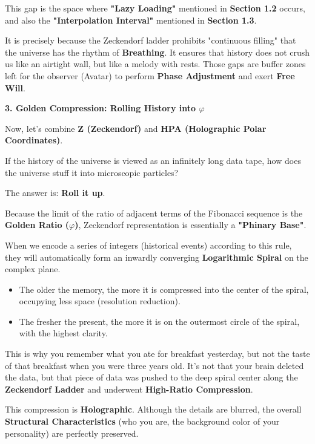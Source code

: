 This gap is the space where \textbf{"Lazy Loading"} mentioned in \textbf{Section 1.2} occurs, and also the \textbf{"Interpolation Interval"} mentioned in \textbf{Section 1.3}.

It is precisely because the Zeckendorf ladder prohibits "continuous filling" that the universe has the rhythm of \textbf{Breathing}. It ensures that history does not crush us like an airtight wall, but like a melody with rests. Those gaps are buffer zones left for the observer (Avatar) to perform \textbf{Phase Adjustment} and exert \textbf{Free Will}.

\textbf{3. Golden Compression: Rolling History into $\varphi$}

Now, let's combine \textbf{Z (Zeckendorf)} and \textbf{HPA (Holographic Polar Coordinates)}.

If the history of the universe is viewed as an infinitely long data tape, how does the universe stuff it into microscopic particles?

The answer is: \textbf{Roll it up}.

Because the limit of the ratio of adjacent terms of the Fibonacci sequence is the \textbf{Golden Ratio ($\varphi$)}, Zeckendorf representation is essentially a \textbf{"Phinary Base"}.

When we encode a series of integers (historical events) according to this rule, they will automatically form an inwardly converging \textbf{Logarithmic Spiral} on the complex plane.

\begin{itemize}
\item The older the memory, the more it is compressed into the center of the spiral, occupying less space (resolution reduction).
\item The fresher the present, the more it is on the outermost circle of the spiral, with the highest clarity.
\end{itemize}

This is why you remember what you ate for breakfast yesterday, but not the taste of that breakfast when you were three years old. It's not that your brain deleted the data, but that piece of data was pushed to the deep spiral center along the \textbf{Zeckendorf Ladder} and underwent \textbf{High-Ratio Compression}.

This compression is \textbf{Holographic}. Although the details are blurred, the overall \textbf{Structural Characteristics} (who you are, the background color of your personality) are perfectly preserved.

